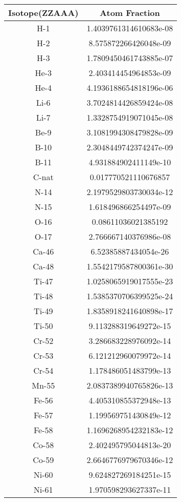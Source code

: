 \begin{table}[h!]
\centering
\begin{tabular}{|| c || c |}
\hline
Isotope(ZZAAA) & Atom Fraction \\
\hline \hline

H-1 & 1.4039761314610683e-08 \\
H-2 & 8.575872266426048e-09 \\
H-3 & 1.7809450461743885e-07 \\
He-3 & 2.403414454964853e-09 \\
He-4 & 4.1936188654818196e-06 \\
Li-6 & 3.7024814426859424e-08 \\
Li-7 & 1.3328754919071045e-08 \\
Be-9 & 3.1081994308479828e-09 \\
B-10 & 2.3048449742374247e-09 \\
B-11 & 4.931884902411149e-10 \\
C-nat & 0.017770521110676857 \\
N-14 & 2.1979529803730034e-12 \\
N-15 & 1.618496866254497e-09 \\
O-16 & 0.08611036021385192 \\
O-17 & 2.766667140376986e-08 \\
Ca-46 & 6.52385887434054e-26 \\
Ca-48 & 1.5542179587800361e-30 \\
Ti-47 & 1.0258065919017555e-23 \\
Ti-48 & 1.5385370706399525e-24 \\
Ti-49 & 1.8358918241640898e-17 \\
Ti-50 & 9.113288319649272e-15 \\
Cr-52 & 3.286683228976092e-14 \\
Cr-53 & 6.121212960079972e-14 \\
Cr-54 & 1.178486051483799e-13 \\
Mn-55 & 2.0837389940765826e-13 \\
Fe-56 & 4.405310855372948e-13 \\
Fe-57 & 1.199569751430849e-12 \\
Fe-58 & 1.1696268954232183e-12 \\
Co-58 & 2.402495795044813e-20 \\
Co-59 & 2.6646776979670346e-12 \\
Ni-60 & 9.624827269184251e-15 \\
Ni-61 & 1.970598293627337e-11 \\

\end{tabular}
\end{table}
